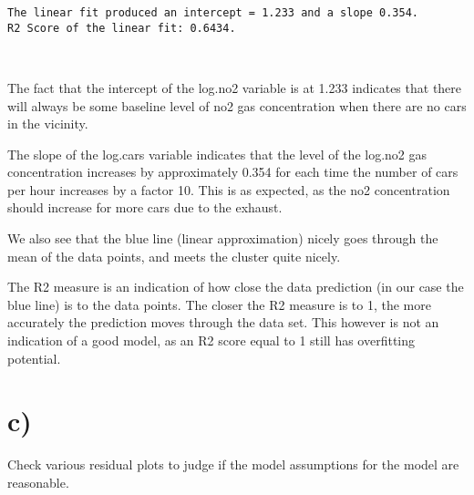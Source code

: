 \documentclass[6pt]{article}
\begin{document}
    \begin{Verbatim}[commandchars=\\\{\}]
The linear fit produced an intercept = 1.233 and a slope 0.354.
R2 Score of the linear fit:	0.6434.

    \end{Verbatim}

    \begin{center}
    \end{center}
    { \hspace*{\fill} \\}
    
    The fact that the intercept of the log.no2 variable is at 1.233
indicates that there will always be some baseline level of no2 gas
concentration when there are no cars in the vicinity.

The slope of the log.cars variable indicates that the level of the
log.no2 gas concentration increases by approximately 0.354 for each time
the number of cars per hour increases by a factor 10. This is as
expected, as the no2 concentration should increase for more cars due to
the exhaust.

We also see that the blue line (linear approximation) nicely goes
through the mean of the data points, and meets the cluster quite nicely.

The R2 measure is an indication of how close the data prediction (in our
case the blue line) is to the data points. The closer the R2 measure is
to 1, the more accurately the prediction moves through the data set.
This however is not an indication of a good model, as an R2 score equal
to 1 still has overfitting potential.

    \section{c)}\label{c}

Check various residual plots to judge if the model assumptions for the
model are reasonable.
\end{document}
